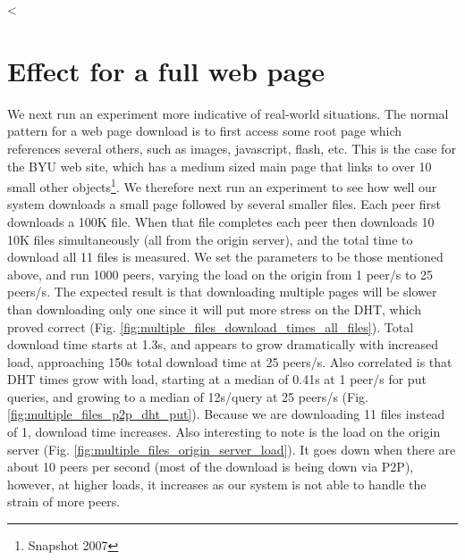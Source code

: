 
<%

\section{Effect for a full web page}

We next run an experiment more indicative of real-world situations. The normal pattern for a web 
page download is to first access some root page which references several others, such as images, 
javascript, flash, etc. This is the case for the BYU web site, which has a medium sized main page that 
links to over 10 small other objects\footnote{Snapshot 2007}. We therefore next run an experiment 
to see how well our system downloads a small page followed by several smaller files. Each peer first 
downloads a 100K file. When that file completes each peer then downloads 10 10K files simultaneously 
(all from the origin server), and the total time to download all 11 files is measured. We set the parameters 
to be those mentioned above, and run 1000 peers, varying the load on the origin from 1 peer/s to 25 
peers/s. 
The expected result is that downloading multiple pages will be slower than downloading only one 
since it will put more stress on the DHT, which proved correct (Fig. \ref{fig:multiple_files_download_times_all_files}). 
Total download time starts at 1.3s, and appears to grow dramatically with increased load, approaching 
150s total download time at 25 peers/s. Also correlated is that DHT times grow with load, starting 
at a median of 0.41s at 1 peer/s for put queries, and growing to a median of 12s/query at 25 peers/s 
(Fig. \ref{fig:multiple_files_p2p_dht_put}). Because we are downloading 11 files instead 
of 1, download time increases. Also interesting to note is the load on the origin server (Fig. \ref{fig:multiple_files_origin_server_load}). 
It goes down when there are about 10 peers per second (most of the download is being down via P2P), 
however, at higher loads, it increases as our system is not able to handle the strain of more peers. 


